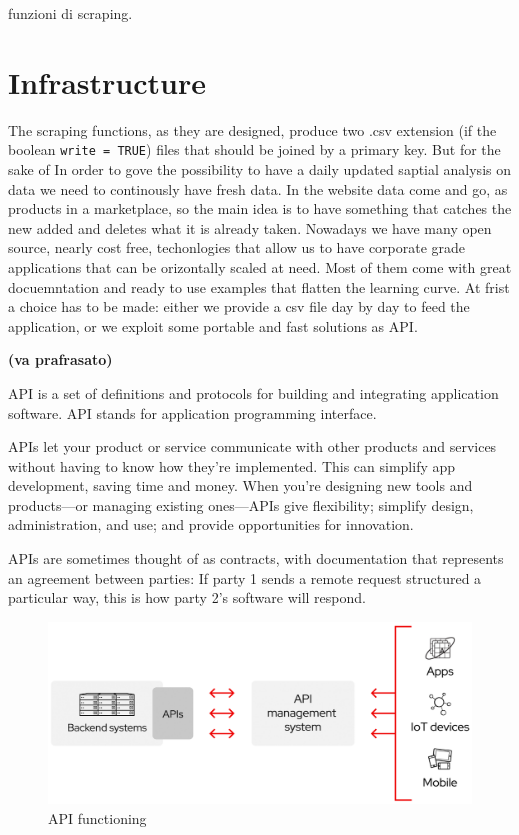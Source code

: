 \documentclass[
  12pt,
  a4paper,
  oneside]{book}
\begin{document}
funzioni di scraping.

\hypertarget{Infrastructure}{%
\chapter{Infrastructure}\label{Infrastructure}}

The scraping functions, as they are designed, produce two .csv extension (if the boolean \texttt{write\ =\ TRUE}) files that should be joined by a primary key. But for the sake of
In order to gove the possibility to have a daily updated saptial analysis on data we need to continously have fresh data. In the website data come and go, as products in a marketplace, so the main idea is to have something that catches the new added and deletes what it is already taken.
Nowadays we have many open source, nearly cost free, techonlogies that allow us to have corporate grade applications that can be orizontally scaled at need. Most of them come with great docuemntation and ready to use examples that flatten the learning curve.
At frist a choice has to be made: either we provide a csv file day by day to feed the application, or we exploit some portable and fast solutions as API.

\textbf{(va prafrasato)}

API \citep{RedHat} is a set of definitions and protocols for building and integrating application software. API stands for application programming interface.

APIs let your product or service communicate with other products and services without having to know how they're implemented. This can simplify app development, saving time and money. When you're designing new tools and products---or managing existing ones---APIs give flexibility; simplify design, administration, and use; and provide opportunities for innovation.

APIs are sometimes thought of as contracts, with documentation that represents an agreement between parties: If party 1 sends a remote request structured a particular way, this is how party 2's software will respond.

\begin{figure}
\includegraphics[width=16.25in]{images/API-page-graphic} \caption{API functioning}\label{fig:API}
\end{figure}
\end{document}
